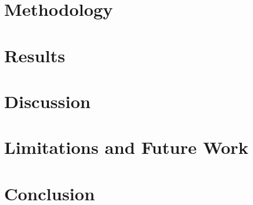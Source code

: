 \documentclass[12pt]{article}
\begin{document}
\section{Methodology}


\section{Results}


\section{Discussion}


\section{Limitations and Future Work}


\section{Conclusion}




\end{document}
